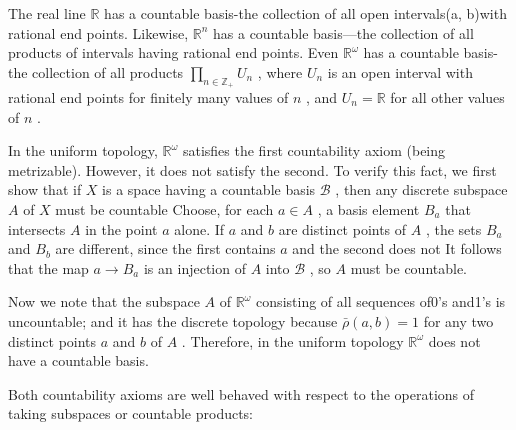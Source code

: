 \begin{centeredblock}
\begin{example}
	The real line \(\mathbb{R}\) has a countable basis-the collection of all open intervals(a, b)with rational end points. Likewise, \({\mathbb{R}}^{n}\) has a countable basis—the collection of all products of intervals having rational end points. Even \({\mathbb{R}}^{\omega }\) has a countable basis-the collection of all products \(\mathop{\prod }\limits_{{n \in  {\mathbb{Z}}_{ + }}}{U}_{n}\) , where \({U}_{n}\) is an open interval with rational end points for finitely many values of \(n\) , and \({U}_{n} = \mathbb{R}\) for all other values of \(n\) .
\end{example}
\end{centeredblock}

\begin{centeredblock}
\begin{example}
	In the uniform topology, \({\mathbb{R}}^{\omega }\) satisfies the first countability axiom (being metrizable). However, it does not satisfy the second. To verify this fact, we first show that if \(X\) is a space having a countable basis \(\mathcal{B}\) , then any discrete subspace \(A\) of \(X\) must be countable Choose, for each \(a \in  A\) , a basis element \({B}_{a}\) that intersects \(A\) in the point \(a\) alone. If \(a\) and \(b\) are distinct points of \(A\) , the sets \({B}_{a}\) and \({B}_{b}\) are different, since the first contains \(a\) and the second does not It follows that the map \(a \rightarrow  {B}_{a}\) is an injection of \(A\) into \(\mathcal{B}\) , so \(A\) must be countable.

Now we note that the subspace \(A\) of \({\mathbb{R}}^{\omega }\) consisting of all sequences of0’s and1’s is uncountable; and it has the discrete topology because \(\bar{\rho }\left( {a,b}\right)  = 1\) for any two distinct points \(a\) and \(b\) of \(A\) . Therefore, in the uniform topology \({\mathbb{R}}^{\omega }\) does not have a countable basis.
\end{example}
\end{centeredblock}

Both countability axioms are well behaved with respect to the operations of taking subspaces or countable products:

